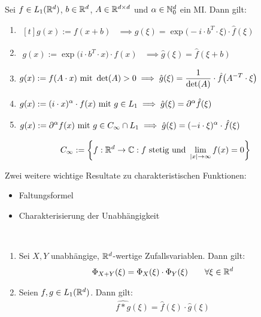 \begin{korollar}\label{korollar6.3}
Sei $f\in L_1(\R^d)$, $b\in\R^d$, $A\in\R^{d\times d}$ und $\alpha\in\N_0^d$ ein MI. Dann gilt:
\begin{enumerate}[label=(\alph*)]
\item $\begin{aligned}[t]
g(x):=f(x+b) 
&\implies \hat{g}(\xi)=\exp\big(-i\cdot b^T\cdot\xi\big)\cdot\hat{f}(\xi)
\end{aligned}$
\item $\begin{aligned}
g(x):=\exp\big(i\cdot b^T\cdot x\big)\cdot f(x) 
&\implies \hat{g}(\xi)=\hat{f}(\xi+b)
\end{aligned}$
\item $\begin{aligned}
g(x):=f(A\cdot x)\mit \det(A)>0 
&\implies \hat{g}(\xi)=\frac{1}{\det(A)}\cdot\hat{f}\big(A^{-T}\cdot\xi\big)
\end{aligned}$
\item $\begin{aligned}
g(x):=(i\cdot x)^\alpha\cdot f(x)\mit g\in L_1 
&\implies \hat{g}(\xi)=\partial^\alpha\hat{f}(\xi)
\end{aligned}$
\item $\begin{aligned}
g(x):=\partial^\alpha f(x)\mit g\in C_\infty\cap L_1 
&\implies \hat{g}(\xi)=(-i\cdot\xi)^\alpha\cdot\hat{f}(\xi)
\end{aligned}$
\end{enumerate}
\end{korollar}

\begin{bemerkung}
\begin{align*}
C_\infty:=\left\lbrace f:\R^d\to\C:f\text{ stetig und }\lim\limits_{|x|\to\infty}f(x)=0\right\rbrace
\end{align*}
\end{bemerkung}

Zwei weitere wichtige Resultate zu charakteristischen Funktionen:
\begin{itemize}
\item Faltungsformel
\item Charakterisierung der Unabhängigkeit
\end{itemize}

\begin{theorem}\label{theorem6.4}\
\begin{enumerate}[label=(\alph*)]
\item Sei $X,Y$ unabhängige, $\R^d$-wertige Zufallsvariablen. Dann gilt:
\begin{align*}
\Phi_{X+Y}(\xi)=\Phi_X(\xi)\cdot\Phi_Y(\xi)\qquad\forall\xi\in\R^d
\end{align*}
\item Seien $f,g\in L_1(\R^d)$. Dann gilt:
\begin{align*}
\widehat{f\ast g}(\xi)=\hat{f}(\xi)\cdot\hat{g}(\xi)
\end{align*}
\end{enumerate}
\end{theorem}

